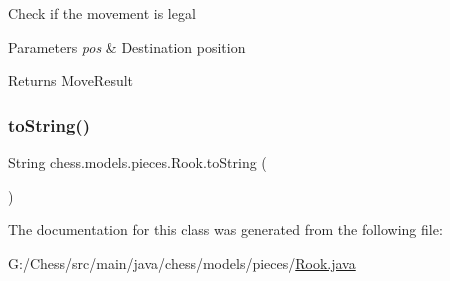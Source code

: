 Check if the movement is legal


\begin{DoxyParams}{Parameters}
{\em pos} & Destination position \\
\hline
\end{DoxyParams}
\begin{DoxyReturn}{Returns}
Move\+Result 
\end{DoxyReturn}
\mbox{\label{classchess_1_1models_1_1pieces_1_1_rook_a73f28ce35486a866fabe250ad4490993}} 
\subsubsection{\texorpdfstring{to\+String()}{toString()}}
{\footnotesize\ttfamily String chess.\+models.\+pieces.\+Rook.\+to\+String (\begin{DoxyParamCaption}{ }\end{DoxyParamCaption})}



The documentation for this class was generated from the following file\+:\begin{DoxyCompactItemize}
\item 
G\+:/\+Chess/src/main/java/chess/models/pieces/\mbox{\hyperlink{_rook_8java}{Rook.\+java}}\end{DoxyCompactItemize}
